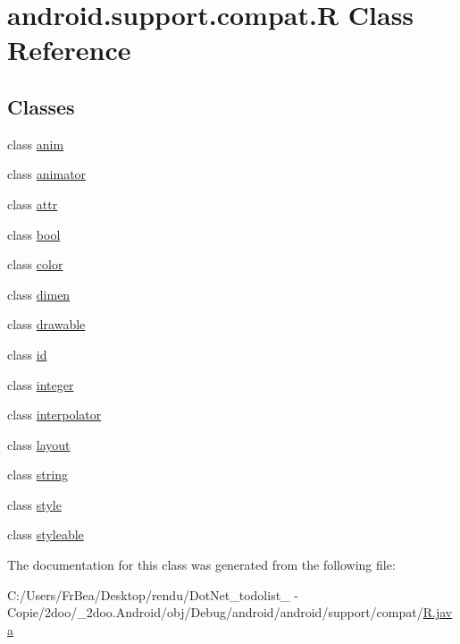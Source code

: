 \hypertarget{classandroid_1_1support_1_1compat_1_1_r}{
\section{android.support.compat.R Class Reference}
\label{classandroid_1_1support_1_1compat_1_1_r}
}
\subsection*{Classes}
\begin{CompactItemize}
\item 
class \hyperlink{classandroid_1_1support_1_1compat_1_1_r_1_1anim}{anim}
\item 
class \hyperlink{classandroid_1_1support_1_1compat_1_1_r_1_1animator}{animator}
\item 
class \hyperlink{classandroid_1_1support_1_1compat_1_1_r_1_1attr}{attr}
\item 
class \hyperlink{classandroid_1_1support_1_1compat_1_1_r_1_1bool}{bool}
\item 
class \hyperlink{classandroid_1_1support_1_1compat_1_1_r_1_1color}{color}
\item 
class \hyperlink{classandroid_1_1support_1_1compat_1_1_r_1_1dimen}{dimen}
\item 
class \hyperlink{classandroid_1_1support_1_1compat_1_1_r_1_1drawable}{drawable}
\item 
class \hyperlink{classandroid_1_1support_1_1compat_1_1_r_1_1id}{id}
\item 
class \hyperlink{classandroid_1_1support_1_1compat_1_1_r_1_1integer}{integer}
\item 
class \hyperlink{classandroid_1_1support_1_1compat_1_1_r_1_1interpolator}{interpolator}
\item 
class \hyperlink{classandroid_1_1support_1_1compat_1_1_r_1_1layout}{layout}
\item 
class \hyperlink{classandroid_1_1support_1_1compat_1_1_r_1_1string}{string}
\item 
class \hyperlink{classandroid_1_1support_1_1compat_1_1_r_1_1style}{style}
\item 
class \hyperlink{classandroid_1_1support_1_1compat_1_1_r_1_1styleable}{styleable}
\end{CompactItemize}


The documentation for this class was generated from the following file:\begin{CompactItemize}
\item 
C:/Users/FrBea/Desktop/rendu/DotNet\_\-todolist\_ - Copie/2doo/\_\-2doo.Android/obj/Debug/android/android/support/compat/\hyperlink{android_2support_2compat_2_r_8java}{R.java}\end{CompactItemize}
